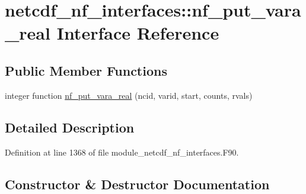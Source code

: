\hypertarget{interfacenetcdf__nf__interfaces_1_1nf__put__vara__real}{}\section{netcdf\+\_\+nf\+\_\+interfaces\+:\+:nf\+\_\+put\+\_\+vara\+\_\+real Interface Reference}
\label{interfacenetcdf__nf__interfaces_1_1nf__put__vara__real}
\subsection*{Public Member Functions}
\begin{DoxyCompactItemize}
\item 
integer function \hyperlink{interfacenetcdf__nf__interfaces_1_1nf__put__vara__real_a7f0988e7dd005b8ce58b80d91a7902af}{nf\+\_\+put\+\_\+vara\+\_\+real} (ncid, varid, start, counts, rvals)
\end{DoxyCompactItemize}


\subsection{Detailed Description}


Definition at line 1368 of file module\+\_\+netcdf\+\_\+nf\+\_\+interfaces.\+F90.



\subsection{Constructor \& Destructor Documentation}
\mbox{\label{interfacenetcdf__nf__interfaces_1_1nf__put__vara__real_a7f0988e7dd005b8ce58b80d91a7902af}} 
